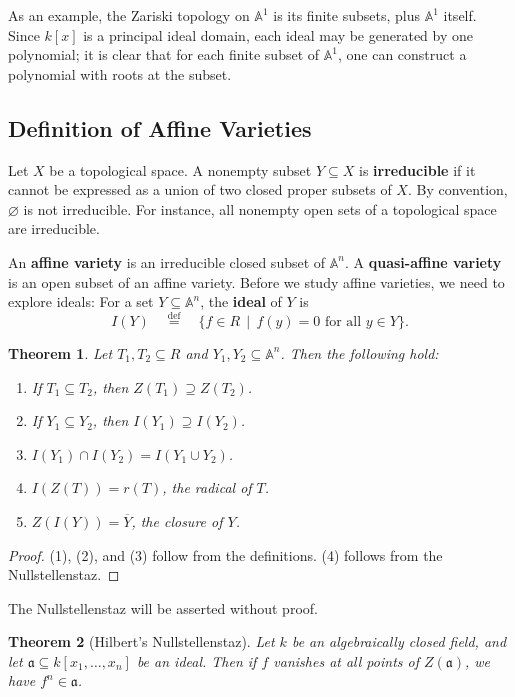 \documentclass[11pt]{article}
\newtheorem{theorem}{Theorem}
\begin{document}
As an example, the Zariski topology on $\mathbb{A}^{1}$ is its finite subsets, plus $\mathbb{A}^{1}$ itself. Since $k[x]$ is a principal ideal domain, each ideal may be generated by one polynomial; it is clear that for each finite subset of $\mathbb{A}^{1}$, one can construct a polynomial with roots at the subset.


\subsection{Definition of Affine Varieties}

Let $X$ be a topological space. A nonempty subset $Y \subseteq X$ is \textbf{irreducible} if it cannot be expressed as a union of two closed proper subsets of $X$. By convention, $\varnothing$ is not irreducible. For instance, all nonempty open sets of a topological space are irreducible.
 
An \textbf{affine variety} is an irreducible closed subset of $\mathbb{A}^{n}$. A \textbf{quasi-affine variety} is an open subset of an affine variety. Before we study affine varieties, we need to explore ideals: For a set $Y \subseteq \mathbb{A}^{n}$, the \textbf{ideal} of $Y$ is
\[
  I(Y) \quad \stackrel{\text{def}}{=} \quad \{ f \in R \, \mid \, f(y) = 0 \text{ for all } y \in Y \}.
\]
\begin{adjustwidth}{0.5cm}{}
  \begin{theorem}
    Let $T_{1}, T_{2} \subseteq R$ and $Y_{1}, Y_{2} \subseteq \mathbb{A}^{n}$. Then the following hold:
    \begin{enumerate}
      \item If $T_{1} \subseteq T_{2}$, then $Z(T_{1}) \supseteq Z(T_{2})$.
      \item If $Y_{1} \subseteq Y_{2}$, then $I(Y_{1}) \supseteq I(Y_{2})$.
      \item $I(Y_{1}) \cap I(Y_{2}) = I(Y_{1} \cup Y_{2})$.
      \item $I(Z(T)) = r(T)$, the radical of $T$.
      \item $Z(I(Y)) = \overline{Y}$, the closure of $Y$.
    \end{enumerate}
  \end{theorem}
  \begin{proof}
    (1), (2), and (3) follow from the definitions. (4) follows from the Nullstellenstaz.
  \end{proof}
\end{adjustwidth}

The Nullstellenstaz will be asserted without proof.

\begin{adjustwidth}{0.5cm}{}
  \begin{theorem}[Hilbert's Nullstellenstaz]
   Let $k$ be an algebraically closed field, and let $\mathfrak{a} \subseteq k[x_{1}, \ldots, x_{n}]$ be an ideal. Then if $f$ vanishes at all points of $Z(\mathfrak{a})$, we have $f^{n} \in \mathfrak{a}$.
  \end{theorem}
\end{adjustwidth}




\end{document}
